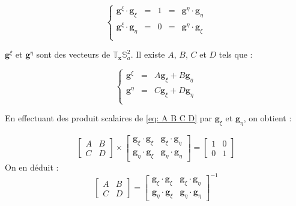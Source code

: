 \begin{equation}
\left\lbrace
\begin{array}{rcccl}
\mathbf{g}^{\xi} \cdot \mathbf{g}_{\xi} & = & 1 & = & \mathbf{g}^{\eta} \cdot \mathbf{g}_{\eta} \\
\mathbf{g}^{\xi} \cdot \mathbf{g}_{\eta} & = & 0 & = & \mathbf{g}^{\eta} \cdot \mathbf{g}_{\xi} \\
\end{array}
\right.
\label{eq: normalisation g_xi g_eta}
\end{equation}

$\mathbf{g}^{\xi}$ et $\mathbf{g}^{\eta}$ sont des vecteurs de $\mathbb{T}_{\mathbf{x}}\mathbb{S}_a^2$. Il existe $A$, $B$, $C$ et $D$ tels que :

\begin{equation}
\left\lbrace
\begin{array}{rcl}
\mathbf{g}^{\xi} & = & A \mathbf{g}_{\xi} + B \mathbf{g}_{\eta} \\
\mathbf{g}^{\eta} & = & C \mathbf{g}_{\xi} + D \mathbf{g}_{\eta} \\
\end{array}
\right.
\label{eq: A B C D}
\end{equation}

En effectuant des produit scalaires de \eqref{eq: A B C D} par $\mathbf{g}_{\xi}$ et $\mathbf{g}_{\eta}$, on obtient :

\begin{equation}
\begin{bmatrix}
A & B \\ C &  D
\end{bmatrix}
\times
\begin{bmatrix}
\mathbf{g}_{\xi} \cdot \mathbf{g}_{\xi} & \mathbf{g}_{\xi} \cdot \mathbf{g}_{\eta} \\
\mathbf{g}_{\eta} \cdot \mathbf{g}_{\xi} & \mathbf{g}_{\eta} \cdot \mathbf{g}_{\eta}
\end{bmatrix}
= \begin{bmatrix}
1 & 0 \\ 0 &  1
\end{bmatrix}
\end{equation}
On en déduit :
\begin{equation}
\begin{bmatrix}
A & B \\ C &  D
\end{bmatrix} 
=
\begin{bmatrix}
\mathbf{g}_{\xi} \cdot \mathbf{g}_{\xi} & \mathbf{g}_{\xi} \cdot \mathbf{g}_{\eta} \\
\mathbf{g}_{\eta} \cdot \mathbf{g}_{\xi} & \mathbf{g}_{\eta} \cdot \mathbf{g}_{\eta}
\end{bmatrix}^{-1}
\end{equation}


